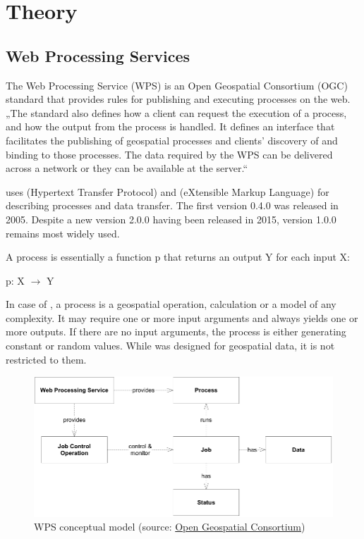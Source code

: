 \chapter{Theory}
\label{2-teorie}

\section{Web Processing Services}

The Web Processing Service (WPS) is an Open Geospatial
Consortium (OGC) standard that provides rules for publishing and
executing processes on the web. „The standard also defines how a
client can request the execution of a process, and how the output from
the process is handled. It defines an interface that facilitates the
publishing of geospatial processes and clients’ discovery of and
binding to those processes. The data required by the WPS can be
delivered across a network or they can be available at the server.“
\cite{wpsstandard}


 uses  (Hypertext Transfer Protocol) and  (eXtensible Markup Language) for describing
processes and data transfer. The first version 0.4.0 was released in
2005. Despite a new version 2.0.0 having been released in 2015,
version 1.0.0 remains most widely used.

A process is essentially a function p that returns an output Y for
each input X:\\ \centerline{p: X $\rightarrow$ Y}

In case of , a process is a geospatial operation, calculation or a
model of any complexity. It may require one or more input arguments
and always yields one or more outputs. If there are no input
arguments, the process is either generating constant or random
values. While  was designed for geospatial data, it is not
restricted to them.

\begin{figure}[H] \centering
  \includegraphics[width=400pt]{./pictures/wps_conceptual_model.png}
      \caption[WPS conceptual model]{WPS conceptual model (source: \href{http://docs.opengeospatial.org/is/14-065/14-065.html\#10}{Open Geospatial Consortium})}
      \label{fig:WPS}
  \end{figure}

